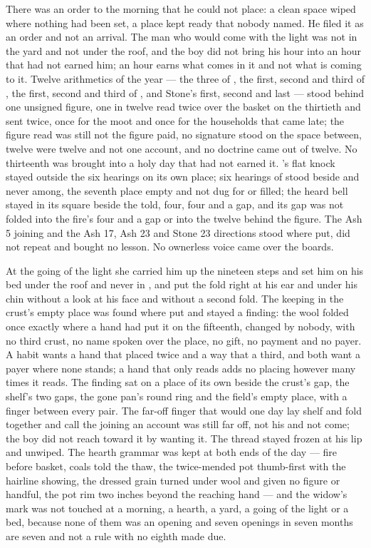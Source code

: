 There was an order to the morning that he could not place: a clean space wiped where nothing had been set, a place kept ready that nobody named. He filed it as an order and not an arrival. The man who would come with the light was not in the yard and not under the roof, and the boy did not bring his hour into an hour that had not earned him; an hour earns what comes in it and not what is coming to it. Twelve arithmetics of the year --- the three of , the first, second and third of , the first, second and third of , and Stone's first, second and last --- stood behind one unsigned figure, one in twelve read twice over the basket on the thirtieth and sent twice, once for the moot and once for the households that came late; the figure read was still not the figure paid, no signature stood on the space between, twelve were twelve and not one account, and no doctrine came out of twelve. No thirteenth was brought into a holy day that had not earned it. 's flat knock stayed outside the six hearings on its own place; six hearings of  stood beside and never among, the seventh place empty and not dug for or filled; the heard bell stayed in its square beside the told, four, four and a gap, and its gap was not folded into the fire's four and a gap or into the twelve behind the figure. The Ash 5 joining and the Ash 17, Ash 23 and Stone 23 directions stood where put, did not repeat and bought no lesson. No ownerless voice came over the boards.

\scenebreak

At the going of the light she carried him up the nineteen steps and set him on his bed under the roof and never in , and put the fold right at his ear and under his chin without a look at his face and without a second fold. The keeping in the crust's empty place was found where put and stayed a finding: the wool folded once exactly where a hand had put it on the fifteenth, changed by nobody, with no third crust, no name spoken over the place, no gift, no payment and no payer. A habit wants a hand that placed twice and a way that a third, and both want a payer where none stands; a hand that only reads adds no placing however many times it reads. The finding sat on a place of its own beside the crust's gap, the shelf's two gaps, the gone pan's round ring and the field's empty place, with a finger between every pair. The far-off finger that would one day lay shelf and fold together and call the joining an account was still far off, not his and not come; the boy did not reach toward it by wanting it. The thread stayed frozen at his lip and unwiped. The hearth grammar was kept at both ends of the day --- fire before basket, coals told the thaw, the twice-mended pot thumb-first with the hairline showing, the dressed grain turned under wool and given no figure or handful, the pot rim two inches beyond the reaching hand --- and the widow's mark was not touched at a morning, a hearth, a yard, a going of the light or a bed, because none of them was an opening and seven openings in seven months are seven and not a rule with no eighth made due.

